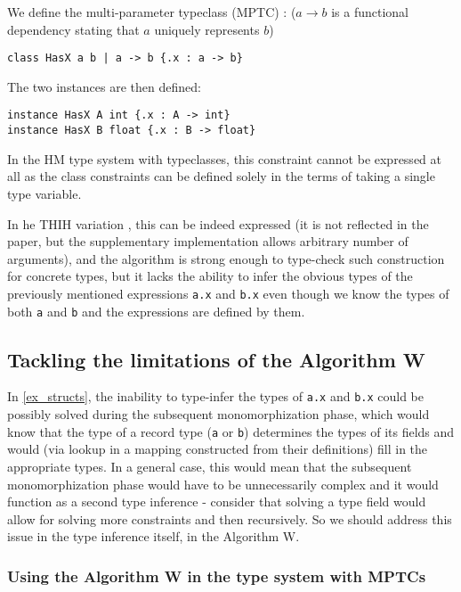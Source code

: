 We define the multi-parameter typeclass (MPTC) : ($a \to b$ is a functional dependency stating that $a$ uniquely represents $b$)

\begin{center}
    \lstinline/class HasX a b | a -> b {.x : a -> b}/
\end{center}

The two instances are then defined:

\begin{lstlisting}
instance HasX A int {.x : A -> int}
instance HasX B float {.x : B -> float}
\end{lstlisting}

In the HM type system with typeclasses, this constraint cannot be expressed at all as the class constraints can be defined solely in the terms of taking a single type variable.

In he THIH variation \cite{jones1999typing}, this can be indeed expressed (it is not reflected in the paper, but the supplementary implementation allows arbitrary number of arguments), and the algorithm is strong enough to type-check such construction for concrete types, but it lacks the ability to infer the obvious types of the previously mentioned expressions \lstinline{a.x} and \lstinline{b.x} even though we know the types of both \lstinline{a} and \lstinline{b} and the expressions are defined by them.

\subsection{Tackling the limitations of the Algorithm W}

In \cref{ex_structs}, the inability to type-infer the types of \lstinline{a.x} and \lstinline{b.x} could be possibly solved during the subsequent monomorphization phase, which would know that the type of a record type (\lstinline{a} or \lstinline{b}) determines the types of its fields and would (via lookup in a mapping constructed from their definitions) fill in the appropriate types. In a general case, this would mean that the subsequent monomorphization phase would have to be unnecessarily complex and it would function as a second type inference - consider that solving a type field would allow for solving more constraints and then recursively. So we should address this issue in the type inference itself, in the Algorithm W.

\subsubsection{Using the Algorithm W in the type system with MPTCs}

